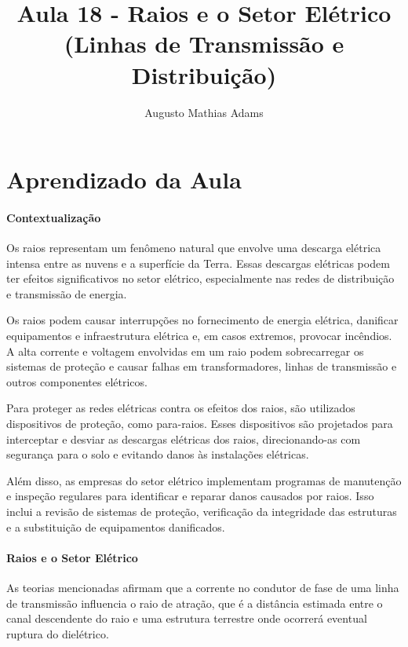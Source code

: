 \documentclass[a4paper, 12pt, onecolumn,singlespacing]{article}
\title{Aula 18 - Raios e o Setor Elétrico (Linhas de Transmissão e Distribuição)}
\author[1]{Augusto Mathias Adams}
\affil[1]{augusto.adams@ufpr.br}
\begin{document}
	
	\maketitle
	
	\section{Aprendizado da Aula}
	
	\paragraph{Contextualização}
	
	Os raios representam um fenômeno natural que envolve uma descarga elétrica intensa entre as nuvens e a superfície da Terra. Essas descargas elétricas podem ter efeitos significativos no setor elétrico, especialmente nas redes de distribuição e transmissão de energia.
	
	Os raios podem causar interrupções no fornecimento de energia elétrica, danificar equipamentos e infraestrutura elétrica e, em casos extremos, provocar incêndios. A alta corrente e voltagem envolvidas em um raio podem sobrecarregar os sistemas de proteção e causar falhas em transformadores, linhas de transmissão e outros componentes elétricos.
	
	Para proteger as redes elétricas contra os efeitos dos raios, são utilizados dispositivos de proteção, como para-raios. Esses dispositivos são projetados para interceptar e desviar as descargas elétricas dos raios, direcionando-as com segurança para o solo e evitando danos às instalações elétricas.
	
	Além disso, as empresas do setor elétrico implementam programas de manutenção e inspeção regulares para identificar e reparar danos causados por raios. Isso inclui a revisão de sistemas de proteção, verificação da integridade das estruturas e a substituição de equipamentos danificados.
	
	\paragraph{Raios e o Setor Elétrico}
	
	As teorias mencionadas afirmam que a corrente no condutor de fase de uma linha de transmissão influencia o raio de atração, que é a distância estimada entre o canal descendente do raio e uma estrutura terrestre onde ocorrerá eventual ruptura do dielétrico.
	
\end{document}
